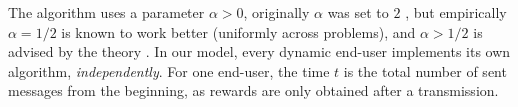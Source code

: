 
The \UCB{} algorithm uses a parameter $\alpha > 0$, originally $\alpha$ was set to $2$ \cite{Auer}, but empirically $\alpha = 1/2$ is known to work better (uniformly across problems), and $\alpha > 1/2$ is advised by the theory \cite{bubeck2012regret}.
%
In our model, every dynamic end-user implements its own \UCB{} algorithm, \emph{independently}.
For one end-user, the time $t$ is the total number of sent messages from the beginning, as rewards are only obtained after a transmission.





